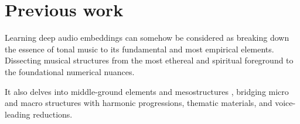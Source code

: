 \section{Previous work}

Learning deep audio embeddings can somehow be considered as breaking down the essence of tonal music to its fundamental and most empirical elements. Dissecting musical structures from the most ethereal and spiritual foreground  to the foundational numerical nuances. 

It also delves into middle-ground elements and mesostructures \cite{Mesostructures2023}, bridging micro and macro structures with harmonic progressions, thematic materials, and voice-leading reductions. 

\subsection{}

